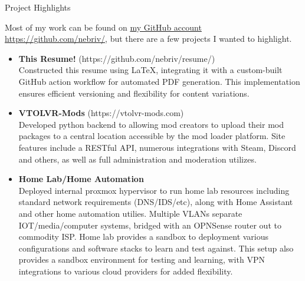 \documentclass[]{mcdowellcv}
\begin{document}
\begin{cvsection}{Project Highlights}
    \begin{cvsubsection}{}{}{}
        Most of my work can be found on \href{https://github.com/nebriv/}{my GitHub account https://github.com/nebriv/}, but there are a few projects I wanted to highlight.\\
        \begin{itemize}
            \setlength\itemsep{3pt}
            \item \textbf{This Resume!} (https://github.com/nebriv/resume/)
            \\Constructed this resume using LaTeX, integrating it with a custom-built GitHub action workflow for automated PDF generation. This implementation ensures efficient versioning and flexibility for content variations.
            \item \textbf{VTOLVR-Mods} (https://vtolvr-mods.com)
            \\Developed python backend to allowing mod creators to upload their mod packages to a central location accessible by the mod loader platform. Site features include a RESTful API, numerous integrations with Steam, Discord and others, as well as full administration and moderation utilizes.
            \item \textbf{Home Lab/Home Automation}
            \\Deployed internal proxmox hypervisor to run home lab resources including standard network requirements (DNS/IDS/etc), along with Home Assistant and other home automation utilies. Multiple VLANs separate IOT/media/computer systems, bridged with an OPNSense router out to commodity ISP. Home lab provides a sandbox to deployment various configurations and software stacks to learn and test against. This setup also provides a sandbox environment for testing and learning, with VPN integrations to various cloud providers for added flexibility.
        \end{itemize}
    \end{cvsubsection}
\end{cvsection}
\end{document}
